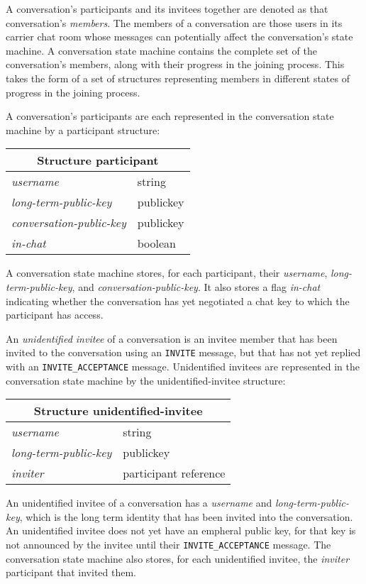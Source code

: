 \documentclass{article}
\def\message#1{\texttt{#1}}
\def\smfield#1{\textsl{#1}}
\def\type#1{\textsf{#1}}
\newenvironment{struct}[1]{
\newcommand{\structfield}[2]{
\smfield{##1} & \type{##2} \\
\hline
}
\par
\vspace{-\medskipamount}
\hspace{2em minus 2em}\begin{tabular}{|l|l|}
\hline
\multicolumn{2}{|c|}{Structure \type{#1}} \\
\hline
\hline
}{
\end{tabular}
\vspace{-\medskipamount}
\par
}
\begin{document}
A conversation's participants and its invitees together are denoted as that conversation's \emph{members}.
The members of a conversation are those users in its carrier chat room whose messages can potentially affect the conversation's state machine.
A conversation state machine contains the complete set of the conversation's members, along with their progress in the joining process.
This takes the form of a set of structures representing members in different states of progress in the joining process.

A conversation's participants are each represented in the conversation state machine by a \type{participant} structure:
\begin{struct}{participant}
\structfield{username}{string}
\structfield{long-term-public-key}{publickey}
\structfield{conversation-public-key}{publickey}
\structfield{in-chat}{boolean}
\end{struct}
A conversation state machine stores, for each participant, their \smfield{username}, \smfield{long-term-public-key}, and \smfield{conversation-public-key}.
It also stores a flag \smfield{in-chat} indicating whether the conversation has yet negotiated a chat key to which the participant has access.

An \emph{unidentified invitee} of a conversation is an invitee member that has been invited to the conversation using an \message{INVITE} message, but that has not yet replied with an \message{INVITE\_ACCEPTANCE} message.
Unidentified invitees are represented in the conversation state machine by the \type{unidentified-invitee} structure:
\begin{struct}{unidentified-invitee}
\structfield{username}{string}
\structfield{long-term-public-key}{publickey}
\structfield{inviter}{participant reference}
\end{struct}
An unidentified invitee of a conversation has a \smfield{username} and \smfield{long-term-public-key}, which is the long term identity that has been invited into the conversation.
An unidentified invitee does not yet have an empheral public key, for that key is not announced by the invitee until their \message{INVITE\_ACCEPTANCE} message.
The conversation state machine also stores, for each unidentified invitee, the \smfield{inviter} participant that invited them.
\end{document}
